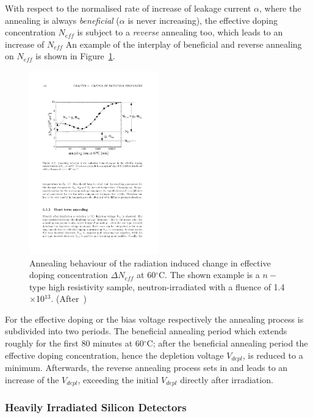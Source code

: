 With respect to the normalised rate of increase of leakage current $\alpha$, where the annealing 
is always {\it beneficial} ($\alpha$ is never increasing), the effective doping concentration $N_{eff}$
is subject to a {\it reverse} annealing too, which leads to an increase of $N_{eff}$
An example of the interplay of beneficial and reverse annealing on $N_{eff}$ is shown in 
Figure~\ref{fig:Neff_annealing}.

\begin{figure}[!htpb]
\centering
\includegraphics[width=0.5\textwidth]{Neff_annealing.pdf}
\caption{\label{fig:Neff_annealing}Annealing behaviour of the radiation induced change in effective 
doping concentration $\Delta N_{eff}$ at 60$^{\circ}$C. The shown example is a $n-$type high 
resistivity sample, neutron-irradiated with a fluence of 1.4$\times$10$^{13}$. 
(After~\cite{moll-thesis})}
\end{figure}


For the effective doping or the bias voltage respectively the annealing process is subdivided into 
two periods. 
The beneficial annealing period which extends roughly for the first 80 minutes at 60$^{\circ}$C; 
after the beneficial annealing period the effective doping concentration, hence the depletion voltage 
$V_{depl}$, is  reduced to a minimum. Afterwards, the reverse annealing process sets in and leads 
to an increase 
of the $V_{depl}$, exceeding the initial $V_{depl}$ directly after 
irradiation.

\subsubsection{Heavily Irradiated Silicon Detectors}

